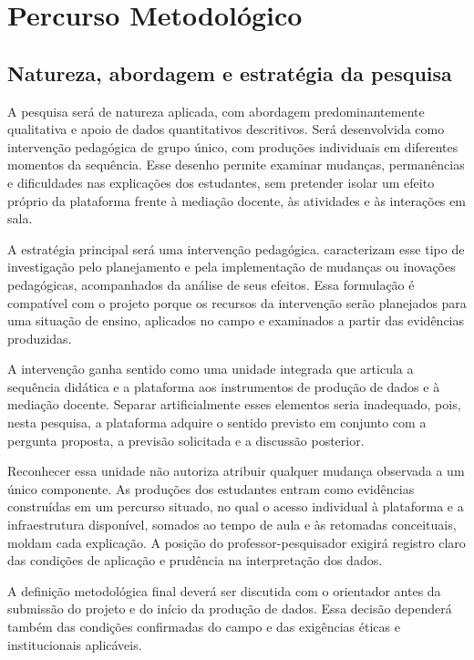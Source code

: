 \chapter{Percurso Metodológico}

\section{Natureza, abordagem e estratégia da pesquisa}

A pesquisa será de natureza aplicada, com abordagem predominantemente qualitativa e apoio de dados quantitativos descritivos. Será desenvolvida como intervenção pedagógica de grupo único, com produções individuais em diferentes momentos da sequência. Esse desenho permite examinar mudanças, permanências e dificuldades nas explicações dos estudantes, sem pretender isolar um efeito próprio da plataforma frente à mediação docente, às atividades e às interações em sala.

A estratégia principal será uma intervenção pedagógica.  caracterizam esse tipo de investigação pelo planejamento e pela implementação de mudanças ou inovações pedagógicas, acompanhados da análise de seus efeitos. Essa formulação é compatível com o projeto porque os recursos da intervenção serão planejados para uma situação de ensino, aplicados no campo e examinados a partir das evidências produzidas.

A intervenção ganha sentido como uma unidade integrada que articula a sequência didática e a plataforma aos instrumentos de produção de dados e à mediação docente. Separar artificialmente esses elementos seria inadequado, pois, nesta pesquisa, a plataforma adquire o sentido previsto em conjunto com a pergunta proposta, a previsão solicitada e a discussão posterior.

Reconhecer essa unidade não autoriza atribuir qualquer mudança observada a um único componente. As produções dos estudantes entram como evidências construídas em um percurso situado, no qual o acesso individual à plataforma e a infraestrutura disponível, somados ao tempo de aula e às retomadas conceituais, moldam cada explicação. A posição do professor-pesquisador exigirá registro claro das condições de aplicação e prudência na interpretação dos dados.

A definição metodológica final deverá ser discutida com o orientador antes da submissão do projeto e do início da produção de dados. Essa decisão dependerá também das condições confirmadas do campo e das exigências éticas e institucionais aplicáveis.

